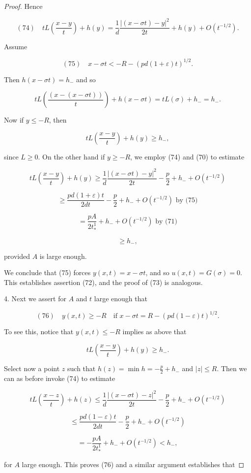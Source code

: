 \begin{proof}
Hence

$$(74) \quad tL\left(\frac{x-y}{t}\right) + h(y) = \frac{1}{d}\frac{|(x-\sigma t)-y|^2}{2t} + h(y) + O(t^{-1/2}).$$

Assume

$$(75) \quad x - \sigma t < -R - (pd(1+\varepsilon)t)^{1/2}.$$

Then $h(x - \sigma t) = h_-$ and so

$$tL\left(\frac{(x-(x-\sigma t))}{t}\right) + h(x-\sigma t) = tL(\sigma) + h_- = h_-.$$

Now if $y \leq -R$, then

$$tL\left(\frac{x-y}{t}\right) + h(y) \geq h_-,$$

since $L \geq 0$. On the other hand if $y \geq -R$, we employ (74) and (70) to estimate

$$tL\left(\frac{x-y}{t}\right) + h(y) \geq \frac{1}{d}\frac{|(x-\sigma t)-y|^2}{2t} - \frac{p}{2} + h_- + O\left(t^{-1/2}\right)$$

$$\geq \frac{pd(1+\varepsilon)t}{2dt} - \frac{p}{2} + h_- + O\left(t^{-1/2}\right) \text{ by (75)}$$

$$= \frac{pA}{2t_*^1} + h_- + O\left(t^{-1/2}\right) \text{ by (71)}$$

$$\geq h_-,$$

provided $A$ is large enough.

We conclude that (75) forces $y(x,t) = x - \sigma t$, and so $u(x,t) = G(\sigma) = 0$. This establishes assertion (72), and the proof of (73) is analogous.

4. Next we assert for $A$ and $t$ large enough that

$$(76) \quad y(x,t) \geq -R \quad \text{if } x - \sigma t = R - (pd(1-\varepsilon)t)^{1/2}.$$

To see this, notice that $y(x,t) \leq -R$ implies as above that

$$tL\left(\frac{x-y}{t}\right) + h(y) \geq h_-.$$

Select now a point $z$ such that $h(z) = \min h = -\frac{p}{2} + h_-$ and $|z| \leq R$. Then we can as before invoke (74) to estimate

$$tL\left(\frac{x-z}{t}\right) + h(z) \leq \frac{1}{d}\frac{|(x-\sigma t)-z|^2}{2t} - \frac{p}{2} + h_- + O\left(t^{-1/2}\right)$$

$$\leq \frac{pd(1-\varepsilon)t}{2dt} - \frac{p}{2} + h_- + O\left(t^{-1/2}\right)$$

$$= -\frac{pA}{2t_*^1} + h_- + O\left(t^{-1/2}\right) < h_-,$$

for $A$ large enough. This proves (76) and a similar argument establishes that


\end{proof}
